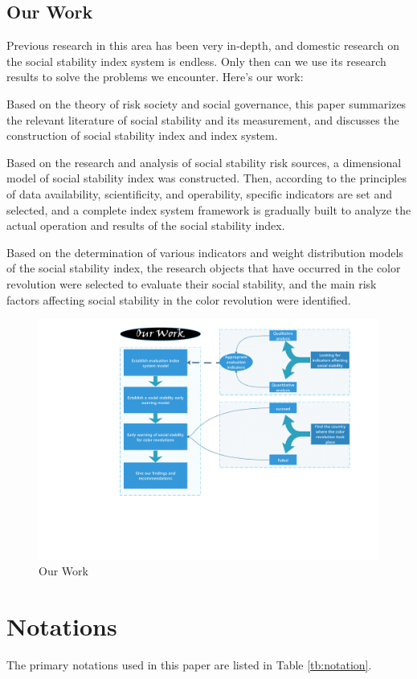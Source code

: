\documentclass[12pt]{article}  %
\begin{document}
\subsection{Our Work}
Previous research in this area has been very in-depth, and domestic research on the social stability index system is endless. Only then can we use its research results to solve the problems we encounter. Here's our work:

Based on the theory of risk society and social governance, this paper summarizes the relevant literature of social stability and its measurement, and discusses the construction of social stability index and index system. 

Based on the research and analysis of social stability risk sources, a dimensional model of social stability index was constructed. Then, according to the principles of data availability, scientificity, and operability, specific indicators are set and selected, and a complete index system framework is gradually built to analyze the actual operation and results of the social stability index.

Based on the determination of various indicators and weight distribution models of the social stability index, the research objects that have occurred in the color revolution were selected to evaluate their social stability, and the main risk factors affecting social stability in the color revolution were identified.
\begin{figure}[htbp]
\centering
\includegraphics[width=.45\textwidth]{img/our work.pdf}
\caption{Our Work}
\end{figure}
\section{Notations}
The primary notations used in this paper are listed in Table \ref{tb:notation}.
\end{document}
